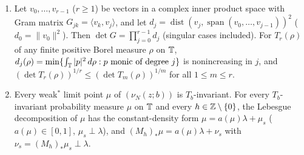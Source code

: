 \documentclass[11pt]{article}
\begin{document}
\begin{lemma}\label{lem:gs-decomp}
\begin{enumerate}[label=\textup{(\alph*)},nosep]
\item Let $v_0,\dots,v_{r-1}$ ($r\ge1$) be vectors in a complex inner product space with Gram matrix $G_{jk}=\langle v_k,v_j\rangle$, and let $d_j=\operatorname{dist}(v_j,\operatorname{span}(v_0,\dots,v_{j-1}))^2$ ($d_0=\|v_0\|^2$). Then $\det G=\prod_{j=0}^{r-1}d_j$ (singular cases included). For $T_r(\rho)$ of any finite positive Borel measure $\rho$ on $\mathbb T$, $d_j(\rho)=\min\{\int_{\mathbb T}|p|^2\,d\rho:p\text{ monic of degree }j\}$ is nonincreasing in $j$, and $(\det T_r(\rho))^{1/r}\le(\det T_m(\rho))^{1/m}$ for all $1\le m\le r$.
\item Every weak$^*$ limit point $\mu$ of $(\nu_N(z;b))$ is $T_b$-invariant. For every $T_b$-invariant probability measure $\mu$ on $\mathbb T$ and every $h\in\mathbb Z\setminus\{0\}$, the Lebesgue decomposition of $\mu$ has the constant-density form $\mu=a(\mu)\lambda+\mu_s$ ($a(\mu)\in[0,1]$, $\mu_s\perp\lambda$), and $(M_h)_*\mu=a(\mu)\lambda+\nu_s$ with $\nu_s=(M_h)_*\mu_s\perp\lambda$.
\end{enumerate}
\end{lemma}
\end{document}
